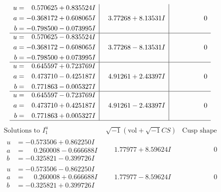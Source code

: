 \documentclass[1p]{elsarticle_modified}
\theoremstyle{definition}
\newcommand{\I}{\sqrt{-1}}
\begin{document}
$$\begin{array}{c|c|c}
\begin{aligned}
u &= \phantom{-}0.570625 + 0.835524 I \\
a &= -0.368172 + 0.608065 I \\
b &= -0.798500 - 0.073995 I\end{aligned}
 & \phantom{-}3.77268 + 8.13531 I & \phantom{-0.000000 } 0 \\ \hline\begin{aligned}
u &= \phantom{-}0.570625 - 0.835524 I \\
a &= -0.368172 - 0.608065 I \\
b &= -0.798500 + 0.073995 I\end{aligned}
 & \phantom{-}3.77268 - 8.13531 I & \phantom{-0.000000 } 0 \\ \hline\begin{aligned}
u &= \phantom{-}0.645597 + 0.723769 I \\
a &= \phantom{-}0.473710 - 0.425187 I \\
b &= \phantom{-}0.771863 - 0.005327 I\end{aligned}
 & \phantom{-}4.91261 + 2.43397 I & \phantom{-0.000000 } 0 \\ \hline\begin{aligned}
u &= \phantom{-}0.645597 - 0.723769 I \\
a &= \phantom{-}0.473710 + 0.425187 I \\
b &= \phantom{-}0.771863 + 0.005327 I\end{aligned}
 & \phantom{-}4.91261 - 2.43397 I & \phantom{-0.000000 } 0\\
 \hline 
 \end{array}$$\newpage$$\begin{array}{c|c|c}  
\text{Solutions to }I^u_{1}& \I (\text{vol} + \sqrt{-1}CS) & \text{Cusp shape}\\
 \hline 
\begin{aligned}
u &= -0.573506 + 0.862250 I \\
a &= \phantom{-}0.260008 - 0.666688 I \\
b &= -0.325821 - 0.399726 I\end{aligned}
 & \phantom{-}1.77977 + 8.59624 I & \phantom{-0.000000 } 0 \\ \hline\begin{aligned}
u &= -0.573506 - 0.862250 I \\
a &= \phantom{-}0.260008 + 0.666688 I \\
b &= -0.325821 + 0.399726 I\end{aligned}
 & \phantom{-}1.77977 - 8.59624 I & \phantom{-0.000000 } 0 \\ \hline\begin{aligned}

\end{aligned}
\end{array}$$
\end{document}
